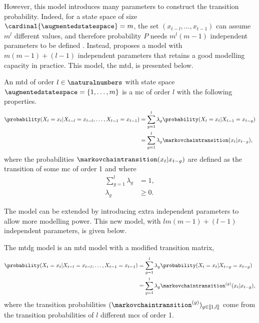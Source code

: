 However, this model introduces many parameters to construct the transition probability.
Indeed, for a state space of size $\cardinal{\augmentedstatespace}=m$, the set $(x_{t-l},\dots,x_{t-1})$ can assume $m^l$ different values, and therefore probability $P$ needs $m^l(m-1)$ independent parameters to be defined \cite{berchtold2002mixture}.
Instead, \cite{raftery1985model} proposes a model with $m(m-1) + (l-1)$ independent parameters that retains a good modelling capacity in practice. 
This model, the \gls{mtd}, is presented below.
 
\begin{defi}
\label{def:mixture_transition_distribution}
    An \gls{mtd} of order $l\in\naturalnumbers$ with state space $\augmentedstatespace=\{1,\dots,m\}$ is a \gls{mc} of order $l$ with the following properties.
    \begin{align*}
        \probability(X_t = x_t\vert X_{t-l}=x_{t-l},\dots,X_{t-1}=x_{t-1})
        &= \sum_{g=1}^l \lambda_g \probability(X_t=x_t\vert X_{t-1}=x_{t-g})
        \\
        &= \sum_{g=1}^l \lambda_g \markovchaintransition(x_t\vert x_{t-g}),
    \end{align*}
    where the probabilities $\markovchaintransition(x_t\vert x_{t-g})$ are defined as the transition of some \gls{mc} of order 1 and where
    \begin{align*}
        \sum_{g=1}^l \lambda_g &=1,
        \\
        \lambda_g &\ge 0.
    \end{align*}
\end{defi}

The model can be extended by introducing extra independent parameters to allow more modelling power.
This new model, with $lm(m-1) + (l-1)$ independent parameters, is given below.

\begin{defi}
\label{def:multimatrix_mixture_transistion_distribution}
    The \gls{mtdg} model is an \gls{mtd} model with a modified transition matrix, 
    \begin{align*}
        \probability(X_t = x_t\vert X_{t-l}=x_{t-l},\dots,X_{t-1}=x_{t-1})
        &= \sum_{g=1}^l \lambda_g \probability(X_t=x_t\vert X_{t-g}=x_{t-g})
        \\
        &= \sum_{g=1}^l \lambda_g \markovchaintransition^{(g)}(x_t\vert x_{t-g}),
    \end{align*}
    where the transition probabilities $(\markovchaintransition^{(g)})_{g\in[\![1,l]\!]}$ come from the transition probabilities of $l$ different \glspl{mc} of order 1.
\end{defi}

